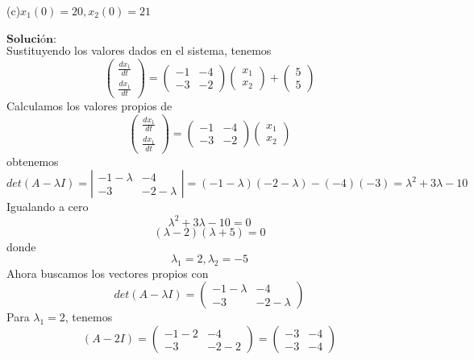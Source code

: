 (c)$x_1(0) = 20, x_2(0) = 21$\\
\\
$\mathbf{Solución:}$
\\
Sustituyendo los valores dados en el sistema, tenemos
$$\begin{pmatrix}
\frac{dx_1}{dt}\\
\frac{dx_1}{dt}
\end{pmatrix} = \begin{pmatrix}
-1 & -4\\
-3 & -2
\end{pmatrix} \begin{pmatrix}
x_1\\
x_2
\end{pmatrix} + \begin{pmatrix}
5\\
5
\end{pmatrix}$$
Calculamos los valores propios de 
$$\begin{pmatrix}
\frac{dx_1}{dt}\\
\frac{dx_1}{dt}
\end{pmatrix} = \begin{pmatrix}
-1 & -4\\
-3 & -2
\end{pmatrix} \begin{pmatrix}
x_1\\
x_2
\end{pmatrix}$$
obtenemos
$$det(A - \lambda I) = \left|\begin{matrix}
-1- \lambda & -4\\
-3 & -2- \lambda
\end{matrix} \right| = (-1- \lambda)(-2- \lambda) - (-4) (-3) = \lambda ^2 + 3\lambda - 10$$
Igualando a cero
$$\lambda ^2 + 3\lambda - 10 = 0$$
$$(\lambda - 2)(\lambda  + 5) = 0$$
donde
$$\lambda _1 = 2 , \lambda _2 = -5$$
Ahora buscamos los vectores propios con
$$det(A - \lambda I) = \begin{pmatrix}
-1- \lambda & -4\\
-3 & -2- \lambda
\end{pmatrix}$$ Para $\lambda_1 = 2$, tenemos
\begin{equation*}
     (A-2I) =
     \begin{pmatrix}
     -1-2 & -4 \\
     -3 & -2-2
     \end{pmatrix}
     =
     \begin{pmatrix}
     -3 & -4\\
     -3 & -4
     \end{pmatrix}
\end{equation*}
